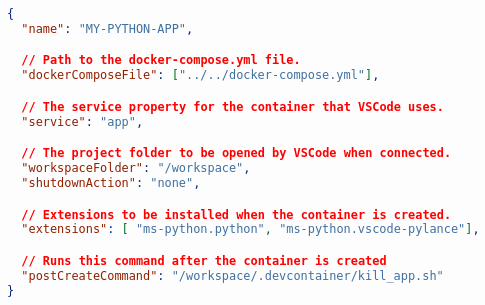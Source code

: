 
\begin{lstlisting}[language=json,caption={\ac{VSCode}s Container Configuration File \code{devcontainer.json} },breaklines=true,label={code::devcontainer_json}]
{
  "name": "MY-PYTHON-APP",

  // Path to the docker-compose.yml file.
  "dockerComposeFile": ["../../docker-compose.yml"],

  // The service property for the container that VSCode uses.
  "service": "app",

  // The project folder to be opened by VSCode when connected.
  "workspaceFolder": "/workspace",
  "shutdownAction": "none",

  // Extensions to be installed when the container is created.
  "extensions": [ "ms-python.python", "ms-python.vscode-pylance"],

  // Runs this command after the container is created
  "postCreateCommand": "/workspace/.devcontainer/kill_app.sh"
}
\end{lstlisting}
